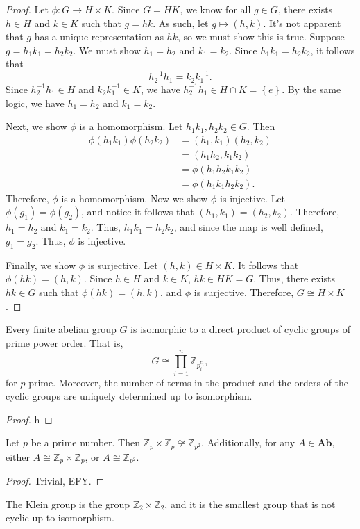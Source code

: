 \begin{proof}
	Let $\phi : G \to H\times K$. Since $G=HK$, we know for all $g\in G$, there exists $h\in H$ and $k\in K$ such that $g=hk$. As such, let $g\mapsto (h,k)$. It's not apparent that $g$ has a unique representation as $hk$, so we must show this is true. Suppose $g=h_1k_1=h_2k_2$. We must show $h_1=h_2$ and $k_1=k_2$. Since $h_1k_1=h_2k_2$, it follows that
	\[
		h_2^{-1}h_1=k_2k_1^{-1}
	.\]
	Since $h_2^{-1}h_1\in H$ and $k_2k_1^{-1}\in K$, we have $h_2^{-1}h_1\in H\cap K=\left\{ e \right\} $. By the same logic, we have $h_1=h_2$ and $k_1=k_2$.

	Next, we show $\phi $ is a homomorphism. Let $h_1k_1,h_2k_2\in G$. Then
	\begin{align*}
		\phi (h_1k_1)\phi (h_2k_2)&=(h_1,k_1)(h_2,k_2)\\
					  &=(h_1h_2,k_1k_2)\\
					  &=\phi (h_1h_2k_1k_2)\\
					  &=\phi (h_1k_1h_2k_2)
	.\end{align*}
	Therefore, $\phi $ is a homomorphism. Now we show $\phi $ is injective. Let $\phi (g_1)=\phi (g_2)$, and notice it follows that $(h_1,k_1)=(h_2,k_2)$. Therefore, $h_1=h_2$ and $k_1=k_2$. Thus, $h_1k_1=h_2k_2$, and since the map is well defined, $g_1=g_2$. Thus, $\phi $ is injective.

	Finally, we show $\phi $ is surjective. Let $(h,k)\in H\times K$. It follows that $\phi (hk)=(h,k)$. Since $h\in H$ and $k\in K$, $hk\in HK=G$. Thus, there exists $hk\in G$ such that $\phi (hk)=(h,k)$, and $\phi $ is surjective. Therefore, $G\cong H\times K$.
\end{proof}
\begin{theorem}\label{thm:fundabel}
	Every finite abelian group $G$ is isomorphic to a direct product of cyclic groups of prime power order. That is,
	\[
		G \cong \prod_{i=1}^n \mathbb{Z}_{p_i^{e_i}}
	,\]
	for $p$ prime. Moreover, the number of terms in the product and the orders of the cyclic groups are uniquely determined up to isomorphism.
\end{theorem}
\begin{proof}
	h
\end{proof}
\begin{corollary}
	Let $p$ be a prime number. Then $\mathbb{Z}_p\times \mathbb{Z}_p \not\cong \mathbb{Z}_{p^2}$. Additionally, for any $A\in \mathbf{Ab}$, either $A \cong \mathbb{Z}_p\times \mathbb{Z}_p$, or $A\cong \mathbb{Z}_{p^2}$.
\end{corollary}
\begin{proof}
	Trivial, EFY.
\end{proof}
\begin{definition}\label{dfn:h}
	The Klein group is the group $\mathbb{Z}_2\times \mathbb{Z}_2$, and it is the smallest group that is not cyclic up to isomorphism.
\end{definition}
